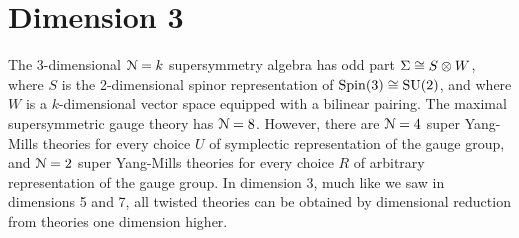 \documentclass[10pt, oneside]{article}
\begin{document}


\section{Dimension 3}
The 3-dimensional $\mathcal{N}=k$ supersymmetry algebra has odd part $\Sigma \cong S \otimes W$, where $S$ is the 2-dimensional spinor representation of $\mathrm{Spin}(3) \cong \mathrm{SU}(2)$, and where $W$ is a $k$-dimensional vector space equipped with a bilinear pairing.  The maximal supersymmetric gauge theory has $\mathcal{N}=8$.  However, there are $\mathcal{N}=4$ super Yang-Mills theories for every choice $U$ of symplectic representation of the gauge group, and $\mathcal{N}=2$ super Yang-Mills theories for every choice $R$ of arbitrary representation of the gauge group.  In dimension 3, much like we saw in dimensions 5 and 7, all twisted theories can be obtained by dimensional reduction from theories one dimension higher.
\end{document}
